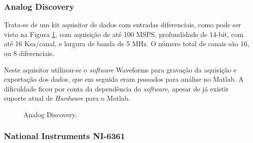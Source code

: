 \documentclass[a4paper,oneside,12pt]{article}
\begin{document}
\subsubsection{Analog Discovery}

Trata-se de um kit aquisitor de dados com entradas diferenciais, como pode ser visto na Figura \ref{fig:analog}, com aquisição de até 100 MSPS, profundidade de 14-bit, com até 16 Ksa/canal, e largura de banda de 5 MHz. O número total de canais são 16, ou 8 diferenciais.

Neste aquisitor utilizou-se o \emph{software} Waveforms para gravação da aquisição e exportação dos dados, que em seguida eram passados para análise no Matlab. A dificuldade ficou por conta da dependência do \emph{software}, apesar de já existir suporte atual de \emph{Hardware} para o Matlab.

\begin{figure}
\centering
{}
\caption{Analog Discovery.}\label{fig:analog}
\end{figure}

\subsubsection{National Instruments NI-6361}
\end{document}
